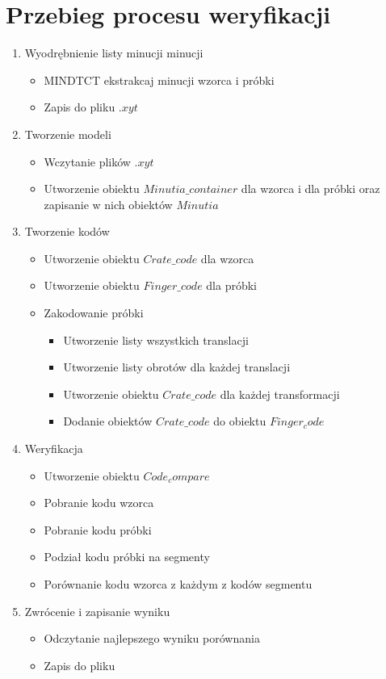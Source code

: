 \section {Przebieg procesu weryfikacji}

\begin{enumerate}
	\item Wyodrębnienie listy minucji minucji
	\renewcommand*{\labelitem}{\bullet}
	\begin{itemize}
		\item MINDTCT ekstrakcaj minucji wzorca i próbki
		\item Zapis do pliku $.xyt$
	\end{itemize}
	\item Tworzenie modeli
	\renewcommand*{\labelitem}{\bullet}
	\begin{itemize}
		\item Wczytanie plików $.xyt$
		\item Utworzenie obiektu $Minutia\_container$ dla wzorca i dla próbki oraz zapisanie w nich obiektów $Minutia$
	\end{itemize}
	\item Tworzenie kodów
	\renewcommand*{\labelitem}{\bullet}
	\begin{itemize}
		\item Utworzenie obiektu $Crate\_code$ dla wzorca
		\item Utworzenie obiektu $Finger\_code$ dla próbki
		\item Zakodowanie próbki
		\begin{itemize}
			\item Utworzenie listy wszystkich translacji
			\item Utworzenie listy obrotów dla każdej translacji
			\item Utworzenie obiektu $Crate\_code$ dla każdej transformacji
			\item Dodanie obiektów $Crate\_code$ do obiektu $Finger_code$
		\end{itemize}
	\end{itemize}
	\item Weryfikacja
	\renewcommand*{\labelitem}{\bullet}
	\begin{itemize}
		\item Utworzenie obiektu $Code_compare$
		\item Pobranie kodu wzorca
		\item Pobranie kodu próbki
		\item Podział kodu próbki na segmenty
		\item Porównanie kodu wzorca z każdym z kodów segmentu
	\end{itemize}
	\item Zwrócenie i zapisanie wyniku
	\renewcommand*{\labelitem}{\bullet}
	\begin{itemize}
		\item Odczytanie najlepszego wyniku porównania
		\item Zapis do pliku
	\end{itemize}
\end{enumerate}